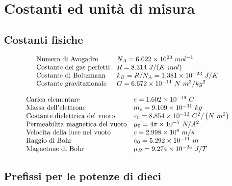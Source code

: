 \chapter{Costanti ed unità di misura}

\section*{Costanti fisiche}

\begin{equation*}
	\begin{array}{ l l }
		\text{Numero di Avogadro} & N_A =6.022\times 10^{23} \ mol^{-1}\\
		\text{Costante dei gas perfetti} & R=8.314\ J/( K\ mol)\\
		\text{Costante di Boltzmann} & k_B =R/N_A =1.381\times 10^{-23} \ J/K\\
		\text{Costante gravitazionale} & G=6.672\times 10^{-11} \ N\ m^2 /kg^2
	\end{array}
\end{equation*}

\begin{equation*}
\begin{array}{ l l }
\text{Carica elementare} & e=1.602\times 10^{-19} \ C\\
\text{Massa dell'elettrone} & m_e =9.109\times 10^{-31} \ kg\\
\text{Costante dielettrica del vuoto} & \varepsilon_0 =8.854\times 10^{-12} \ C^2 /\left( N\ m^2\right)\\
\text{Permeabilita magnetica del vuoto} & \mu_0 =4\pi \times 10^{-7} \ N/A^2\\
\text{Velocita della luce nel vuoto} & c=2.998\times 10^8 \ m/s\\
\text{Raggio di Bohr} & a_0 =5.292\times 10^{-11} \ m\\
\text{Magnetone di Bohr} & \mu_B =9.274\times 10^{-24} \ J/T
\end{array}
\end{equation*}

\section*{Prefissi per le potenze di dieci}

